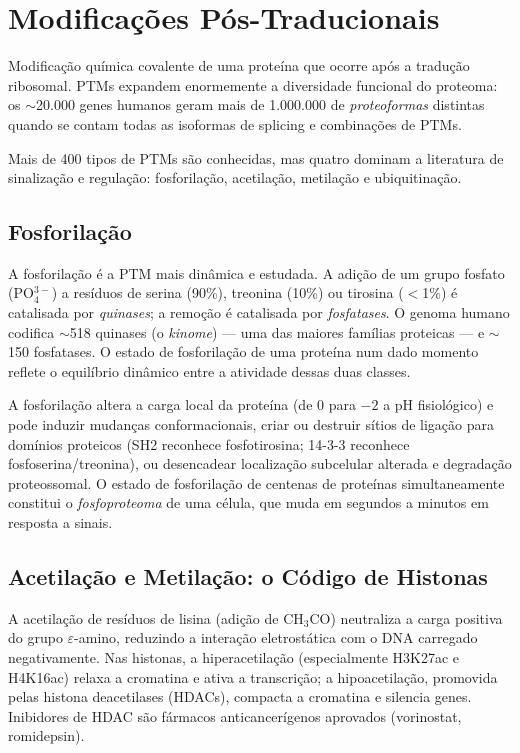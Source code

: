 \section{Modificações Pós-Traducionais}

\begin{definicaoenv}
Modificação química covalente de uma proteína que ocorre após a tradução ribosomal.
PTMs expandem enormemente a diversidade funcional do proteoma: os $\sim$20.000 genes
humanos geram mais de 1.000.000 de \emph{proteoformas} distintas quando se contam
todas as isoformas de splicing e combinações de PTMs.
\end{definicaoenv}

Mais de 400 tipos de PTMs são conhecidas, mas quatro dominam a literatura de sinalização
e regulação: fosforilação, acetilação, metilação e ubiquitinação.

\subsection{Fosforilação}

A fosforilação é a PTM mais dinâmica e estudada. A adição de um grupo fosfato (PO$_4^{3-}$)
a resíduos de serina (90\%), treonina (10\%) ou tirosina ($<$1\%) é catalisada por
\emph{quinases}; a remoção é catalisada por \emph{fosfatases}. O genoma humano codifica
$\sim$518 quinases (o \emph{kinome}) --- uma das maiores famílias proteicas --- e $\sim$150
fosfatases. O estado de fosforilação de uma proteína num dado momento reflete o equilíbrio
dinâmico entre a atividade dessas duas classes.

A fosforilação altera a carga local da proteína (de 0 para $-2$ a pH fisiológico) e pode
induzir mudanças conformacionais, criar ou destruir sítios de ligação para domínios
proteicos (SH2 reconhece fosfotirosina; 14-3-3 reconhece fosfoserina/treonina), ou
desencadear localização subcelular alterada e degradação proteossomal. O estado de
fosforilação de centenas de proteínas simultaneamente constitui o \emph{fosfoproteoma}
de uma célula, que muda em segundos a minutos em resposta a sinais.

\subsection{Acetilação e Metilação: o Código de Histonas}

A acetilação de resíduos de lisina (adição de CH$_3$CO) neutraliza a carga positiva do
grupo $\varepsilon$-amino, reduzindo a interação eletrostática com o DNA carregado
negativamente. Nas histonas, a hiperacetilação (especialmente H3K27ac e H4K16ac) relaxa
a cromatina e ativa a transcrição; a hipoacetilação, promovida pelas histona deacetilases
(HDACs), compacta a cromatina e silencia genes. Inibidores de HDAC são fármacos
anticancerígenos aprovados (vorinostat, romidepsin).

